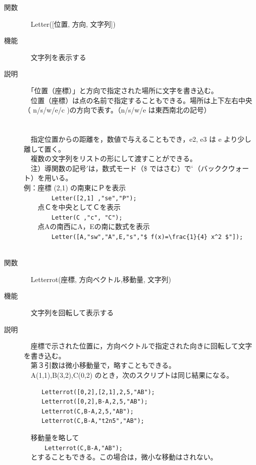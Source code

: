 \documentclass[papersize,a4paper,12pt,uplatex]{jsarticle}
\begin{document}
\begin{description}
\hypertarget{letter}{}\item[関数]　Letter([位置, 方向, 文字列])
\item[機能]　文字列を表示する
\item[説明]　「位置（座標）」と方向で指定された場所に文字を書き込む。\\
　位置（座標）は点の名前で指定することもできる。場所は上下左右中央（ n/s/w/e/c )の方向で表す。（n/s/w/e は東西南北の記号）\\
　\\
　　　　　　　\\
　指定位置からの距離を，数値で与えることもでき，e2, e3 は e より少し離して置く。\\
　複数の文字列をリストの形にして渡すことができる。\\
　注）導関数の記号$'$は，数式モード（\$ ではさむ）で$`$（バッククウォート）を用いる。\\
  
例：座標 (2,1) の南東にＰを表示\\
　　　　\verb|Letter([2,1] ,"se","P");|\\
　　点Ｃを中央としてＣを表示\\
　　　　\verb|Letter(C ,"c", "C");|\\
　　点Aの南西にA，Eの南に数式を表示\\
　　　　\verb|Letter([A,"sw","A",E,"s","$ f(x)=\frac{1}{4} x^2 $"]);| \\
　\\
%

\hypertarget{letterrot}{}\item[関数]　Letterrot(座標, 方向ベクトル,移動量, 文字列)
\item[機能]　文字列を回転して表示する
\item[説明]　座標で示された位置に，方向ベクトルで指定された向きに回転して文字を書き込む。\\
　第３引数は微小移動量で，略すこともできる。\\
　A(1,1),B(3,2),C(0,2) のとき，次のスクリプトは同じ結果になる。
\begin{verbatim}
　　　Letterrot([0,2],[2,1],2,5,"AB");
　　　Letterrot([0,2],B-A,2,5,"AB");
　　　Letterrot(C,B-A,2,5,"AB");
　　　Letterrot(C,B-A,"t2n5","AB");
\end{verbatim}
　移動量を略して\\
　　　\verb|Letterrot(C,B-A,"AB");|\\
　とすることもできる。この場合は，微小な移動はされない。\\



\end{description}
\end{document}
